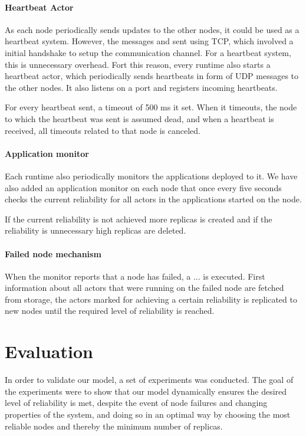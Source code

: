 \documentclass{cslthse-msc}
\begin{document}
\subsubsection{Heartbeat Actor}
As each node periodically sends updates to the other nodes, it could be used as a heartbeat system. However, the messages and sent using TCP, which involved a initial handshake to setup the communication channel. For a heartbeat system, this is unnecessary overhead. Fort this reason, every runtime also starts a heartbeat actor, which periodically sends heartbeats in form of UDP messages to the other nodes. It also listens on a port and registers incoming heartbeats.

For every heartbeat sent, a timeout of 500 ms it set. When it timeouts, the node to which the heartbeat was sent is assumed dead, and when a heartbeat is received, all timeouts related to that node is canceled.

\subsubsection{Application monitor}
Each runtime also periodically monitors the applications deployed to it. We have also added an application monitor on each node that once every five seconds checks the current reliability for all actors in the applications started on the node. 

If the current reliability is not achieved more replicas is created and if the reliability is unnecessary high replicas are deleted.

\subsubsection{Failed node mechanism}
When the monitor reports that a node has failed, a ... is executed. First information about all actors that were running on the failed node are fetched from storage, the actors marked for achieving a certain reliability is replicated to new nodes until the required level of reliability is reached. 


\chapter{Evaluation} \label{ch:evaluation}
In order to validate our model, a set of experiments was conducted. The goal of the experiments were to show that our model dynamically ensures the desired level of reliability is met, despite the event of node failures and changing properties of the system, and doing so in an optimal way by choosing the most reliable nodes and thereby the minimum number of replicas.
\end{document}
